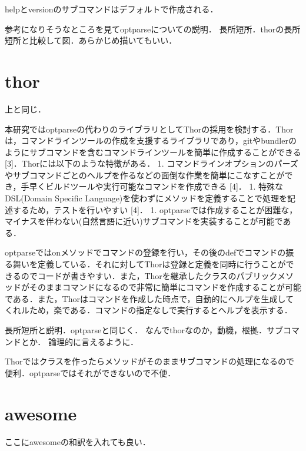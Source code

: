 helpとversionのサブコマンドはデフォルトで作成される．

参考になりそうなところを見てoptparseについての説明．
長所短所．thorの長所短所と比較して図．あらかじめ描いてもいい．

\section{thor}\label{thor}

上と同じ．

本研究ではoptparseの代わりのライブラリとしてThorの採用を検討する．Thorは，コマンドラインツールの作成を支援するライブラリであり，gitやbundlerのようにサブコマンドを含むコマンドラインツールを簡単に作成することができる
{[}3{]}．Thorには以下のような特徴がある． 1.
コマンドラインオプションのパーズやサブコマンドごとのヘルプを作るなどの面倒な作業を簡単にこなすことができ，手早くビルドツールや実行可能なコマンドを作成できる
{[}4{]}． 1. 特殊なDSL(Domain Specific
Language)を使わずにメソッドを定義することで処理を記述するため，テストを行いやすい
{[}4{]}． 1.
optparseでは作成することが困難な，マイナスを伴わない(自然言語に近い)サブコマンドを実装することが可能である．

\begin{Shaded}
\begin{Highlighting}[]
\NormalTok{, }
\NormalTok{ => }
\OtherTok{#\{}\OtherTok{\}}\OtherTok{#\{}\NormalTok{help[}\NormalTok{][}\NormalTok{]}\OtherTok{\}}
\NormalTok{      \}}
\end{Highlighting}
\end{Shaded}

optparseではonメソッドでコマンドの登録を行い，その後のdefでコマンドの振る舞いを定義している．それに対してThorは登録と定義を同時に行うことができるのでコードが書きやすい．また，Thorを継承したクラスのパブリックメソッドがそのままコマンドになるので非常に簡単にコマンドを作成することが可能である．また，Thorはコマンドを作成した時点で，自動的にヘルプを生成してくれルため，楽である．コマンドの指定なしで実行するとヘルプを表示する．

長所短所と説明．optparseと同じく．
なんでthorなのか，動機，根拠．サブコマンドとか． 論理的に言えるように．

Thorではクラスを作ったらメソッドがそのままサブコマンドの処理になるので便利．optparseではそれができないので不便．

\section{awesome}\label{awesome}

ここにawesomeの和訳を入れても良い．

    